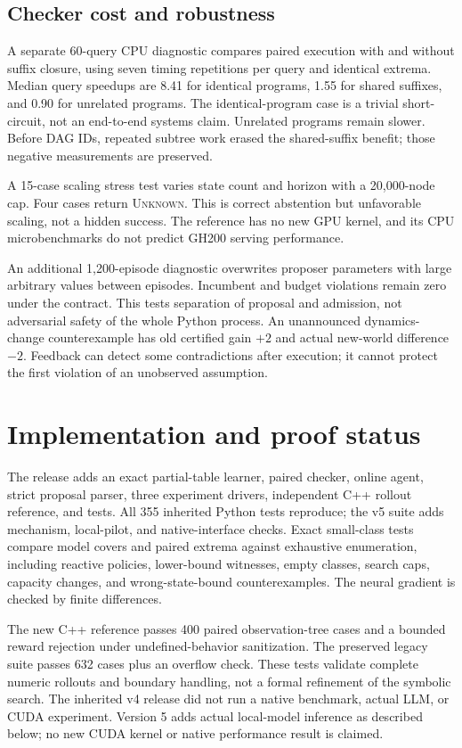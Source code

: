 \documentclass[10pt,twocolumn]{article}
\newcommand{\unk}{\textsc{Unknown}}
\begin{document}
\subsection{Checker cost and robustness}
A separate 60-query CPU diagnostic compares paired execution with and without
suffix closure, using seven timing repetitions per query and identical extrema.
Median query speedups are 8.41 for identical programs, 1.55 for shared suffixes,
and 0.90 for unrelated programs. The identical-program case is a trivial
short-circuit, not an end-to-end systems claim. Unrelated programs remain slower.
Before DAG IDs, repeated subtree work erased the shared-suffix benefit; those
negative measurements are preserved.

A 15-case scaling stress test varies state count and horizon with a 20,000-node
cap. Four cases return \unk. This is correct abstention but unfavorable scaling,
not a hidden success. The reference has no new GPU kernel, and its CPU
microbenchmarks do not predict GH200 serving performance.

An additional 1,200-episode diagnostic overwrites proposer parameters with large
arbitrary values between episodes. Incumbent and budget violations remain zero
under the contract. This tests separation of proposal and admission, not
adversarial safety of the whole Python process. An unannounced dynamics-change
counterexample has old certified gain $+2$ and actual new-world difference $-2$.
Feedback can detect some contradictions after execution; it cannot protect the
first violation of an unobserved assumption.

\section{Implementation and proof status}
The release adds an exact partial-table learner, paired checker, online agent,
strict proposal parser, three experiment drivers, independent C++ rollout
reference, and tests. All 355 inherited Python tests reproduce; the v5 suite adds mechanism,
local-pilot, and native-interface checks. Exact small-class tests compare
model covers and paired extrema against exhaustive enumeration, including
reactive policies, lower-bound witnesses, empty classes, search caps, capacity
changes, and wrong-state-bound counterexamples. The neural gradient is checked
by finite differences.

The new C++ reference passes 400 paired observation-tree cases and a bounded
reward rejection under undefined-behavior sanitization. The preserved legacy
suite passes 632 cases plus an overflow check. These tests validate complete
numeric rollouts and boundary handling, not a formal refinement of the symbolic
search. The inherited v4 release did not run a native benchmark, actual LLM, or CUDA
experiment. Version 5 adds actual local-model inference as described below;
no new CUDA kernel or native performance result is claimed.
\end{document}

